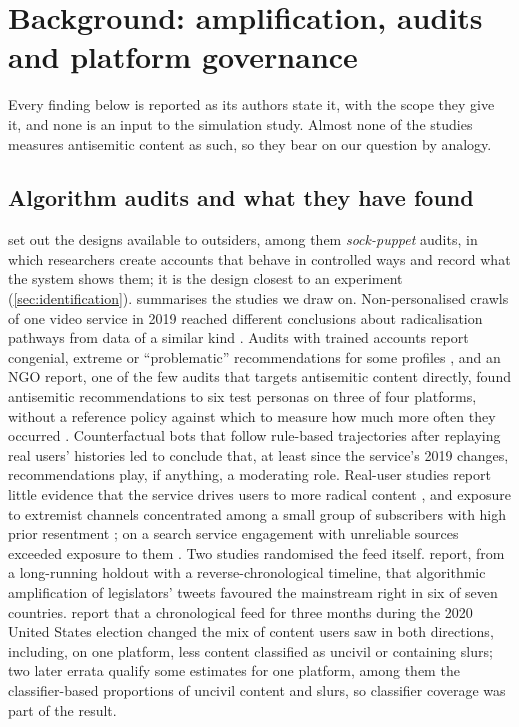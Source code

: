 \section{Background: amplification, audits and platform governance}\label{sec:background}

Every finding below is reported as its authors state it, with the scope they give it, and none is an input to the simulation study. Almost none of the studies measures antisemitic content as such, so they bear on our question by analogy.

\subsection{Algorithm audits and what they have found}\label{sec:bg-audits}

 set out the designs available to outsiders, among them \emph{sock-puppet} audits, in which researchers create accounts that behave in controlled ways and record what the system shows them; it is the design closest to an experiment (\cref{sec:identification}).  summarises the studies we draw on. Non-personalised crawls of one video service in 2019 reached different conclusions about radicalisation pathways from data of a similar kind \citep{ribeiro2020,ledwich2020}. Audits with trained accounts report congenial, extreme or ``problematic'' recommendations for some profiles \citep{whittaker2021,haroon2023}, and an NGO report, one of the few audits that targets antisemitic content directly, found antisemitic recommendations to six test personas on three of four platforms, without a reference policy against which to measure how much more often they occurred \citep{adl2023badtoworse}. Counterfactual bots that follow rule-based trajectories after replaying real users' histories led \citet{hosseinmardi2024} to conclude that, at least since the service's 2019 changes, recommendations play, if anything, a moderating role. Real-user studies report little evidence that the service drives users to more radical content \citep{hosseinmardi2021}, and exposure to extremist channels concentrated among a small group of subscribers with high prior resentment \citep{chen2023}; on a search service engagement with unreliable sources exceeded exposure to them \citep{robertson2023}. Two studies randomised the feed itself.  report, from a long-running holdout with a reverse-chronological timeline, that algorithmic amplification of legislators' tweets favoured the mainstream right in six of seven countries.  report that a chronological feed for three months during the 2020 United States election changed the mix of content users saw in both directions, including, on one platform, less content classified as uncivil or containing slurs; two later errata qualify some estimates for one platform, among them the classifier-based proportions of uncivil content and slurs, so classifier coverage was part of the result.

